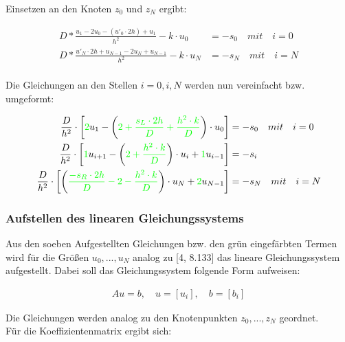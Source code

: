 \documentclass[
	pagesize,
	fontsize=12pt,
	paper=a4,
	oneside,
   reqno
]{scrartcl}
\begin{document}
Einsetzen an den Knoten $z_0$ und $z_N$ ergibt:

\begin{align*}
   D*\frac{u_1-2u_0-(u'_0\cdot 2h)+u_1}{h^2} - k\cdot u_0 &= -s_0 \quad mit \quad i = 0 \\
   D*\frac{u'_N\cdot 2h+u_{N-1}-2u_N+u_{N-1}}{h^2} - k\cdot u_N &= -s_N \quad mit \quad i = N \\
\end{align*}

Die Gleichungen an den Stellen $i=0, i, N$ werden nun vereinfacht bzw. umgeformt:

\begin{align*}
   \frac{D}{h^2}\cdot \left[ \textcolor{green}{2}u_1-\left( \textcolor{green}{2+\frac{s_L\cdot 2h}{D}+\frac{h^2\cdot k}{D}}\right) \cdot u_0\right] &= -s_0 \quad mit \quad i = 0 \\
   \frac{D}{h^2}\cdot \left[ \textcolor{green}{1}u_{i+1}-\left( \textcolor{green}{2+\frac{h^2\cdot k}{D}}\right) \cdot u_i+\textcolor{green}{1}u_{i-1}\right] &= -s_i \\
   \frac{D}{h^2}\cdot \left[ \left( \textcolor{green}{\frac{-s_R\cdot 2h}{D}-2-\frac{h^2\cdot k}{D}}\right) \cdot u_N+\textcolor{green}{2}u_{N-1}\right] &= -s_N \quad mit \quad i = N \\
\end{align*}

\subsubsection{Aufstellen des linearen Gleichungssystems}

Aus den soeben Aufgestellten Gleichungen bzw. den grün eingefärbten Termen wird für die Größen $u_0, ... , u_{N}$ analog zu [4, 8.133] das lineare Gleichungssystem aufgestellt. Dabei soll das Gleichungssystem folgende Form aufweisen:

\begin{align}
   \label{eq:eq7}
   Au = b, \quad u = [u_i], \quad b = [b_i]
\end{align}

Die Gleichungen werden analog zu den Knotenpunkten $z_0, ... , z_N$ geordnet. \\

Für die Koeffizientenmatrix ergibt sich:
\end{document}
